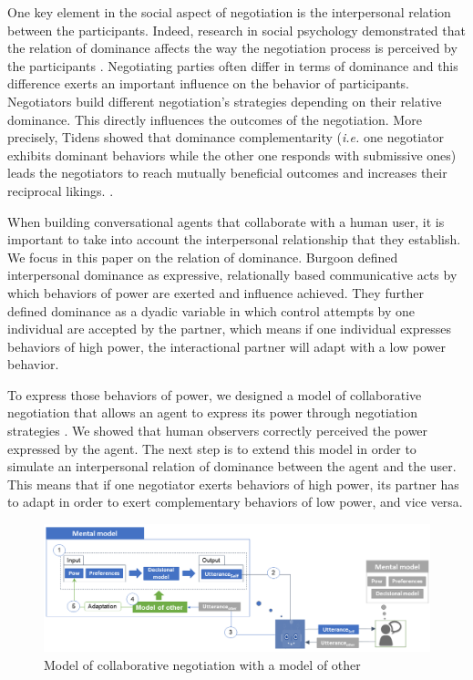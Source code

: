 \documentclass[conference, letterpaper]{IEEEtran}
\begin{document}
		One key element in the social aspect of negotiation is the interpersonal relation between the participants. Indeed, research in social psychology demonstrated that the relation of dominance affects the way the negotiation process is perceived by the participants \cite{van2006power}.  
		Negotiating parties often differ in terms of dominance and this difference exerts an important influence on the behavior of participants. Negotiators build different negotiation's strategies depending on their relative dominance. This directly influences the outcomes of the negotiation. More precisely, Tidens \cite{tiedens2003power} showed that dominance complementarity (\emph{i.e.} one negotiator exhibits dominant behaviors while the other one responds with submissive ones) leads the negotiators to reach mutually beneficial outcomes and increases their reciprocal likings. \cite{wiltermuth2015benefits,tiedens2003power}.
	
		When building conversational agents that collaborate with a human user, it is important  to take into account the interpersonal relationship that they establish. We focus in this paper on the relation of dominance. Burgoon \cite{burgoon1998nature} defined interpersonal dominance as expressive, relationally based communicative acts by which behaviors of power are exerted and influence achieved. They further defined dominance as a dyadic variable in which control attempts by one individual are accepted by the partner, which means if one individual expresses behaviors of high power, the interactional partner will adapt with a low power behavior. 
	
		To express those behaviors of power, we designed a model of collaborative negotiation that allows an agent to express its power through negotiation strategies \cite{ouali2017computational}. We showed that human observers correctly perceived the power expressed by the agent.
		The next step is to extend this model in order to simulate an interpersonal relation of dominance between the agent and the user. This means that if one negotiator exerts behaviors of high power, its partner has to adapt in order to exert complementary behaviors of low power, and vice versa.
		
		\begin{figure}[h]
			\centering
			\includegraphics[width=0.8\linewidth]{figs/model/general.png}
			\caption{Model of collaborative negotiation with a model of other} 
			\label{fig:schema-general}
		\end{figure} 
	
\end{document}
